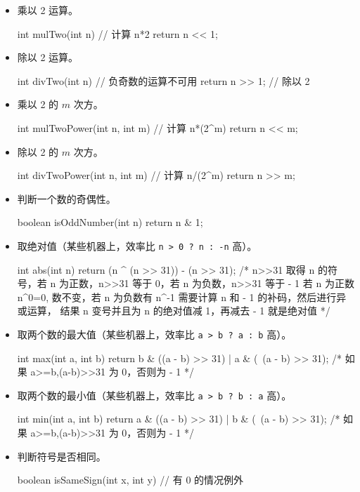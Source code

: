{\begin{itemize}
\item 乘以 2 运算。
\begin{cppcode}
int mulTwo(int n) {  // 计算 n*2
  return n << 1;
}
\end{cppcode}
\item 除以 2 运算。
\begin{cppcode}
int divTwo(int n) {  // 负奇数的运算不可用
  return n >> 1;     // 除以 2
}
\end{cppcode}
\item 乘以 2 的 $m$ 次方。
\begin{cppcode}
int mulTwoPower(int n, int m) {  // 计算 n*(2^m)
  return n << m;
}
\end{cppcode}
\item 除以 2 的 $m$ 次方。
\begin{cppcode}
int divTwoPower(int n, int m) {  // 计算 n/(2^m)
  return n >> m;
}
\end{cppcode}
\item 判断一个数的奇偶性。
\begin{cppcode}
boolean isOddNumber(int n) { return n & 1; }
\end{cppcode}
\item 取绝对值（某些机器上，效率比 \texttt{n > 0 ? n : -n} 高）。
\begin{cppcode}
int abs(int n) {
  return (n ^ (n >> 31)) - (n >> 31);
  /* n>>31 取得 n 的符号，若 n 为正数，n>>31 等于 0，若 n 为负数，n>>31 等于 - 1
     若 n 为正数 n^0=0, 数不变，若 n 为负数有 n^-1
     需要计算 n 和 - 1 的补码，然后进行异或运算，
     结果 n 变号并且为 n 的绝对值减 1，再减去 - 1 就是绝对值 */
}
\end{cppcode}
\item 取两个数的最大值（某些机器上，效率比 \texttt{a > b ? a : b} 高）。
\begin{cppcode}
int max(int a, int b) {
  return b & ((a - b) >> 31) | a & (~(a - b) >> 31);
  /* 如果 a>=b,(a-b)>>31 为 0，否则为 - 1 */
}
\end{cppcode}
\item 取两个数的最小值（某些机器上，效率比 \texttt{a > b ? b : a} 高）。
\begin{cppcode}
int min(int a, int b) {
  return a & ((a - b) >> 31) | b & (~(a - b) >> 31);
  /* 如果 a>=b,(a-b)>>31 为 0，否则为 - 1 */
}
\end{cppcode}
\item 判断符号是否相同。
\begin{cppcode}
boolean isSameSign(int x, int y) {  // 有 0 的情况例外
}
\end{cppcode}
\end{itemize}}
